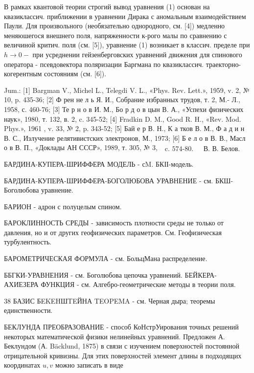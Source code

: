 \documentclass[10pt]{article}
\begin{document}
В рамках квантовой теории строгий вывод уравнения (1) основан на квазиклассич. приближении в уравнении Дирака с аномальным взаимодействием Паули. Для произвольного (необязательно однородного, см. [4]) медленно меняюшегося внешнего поля, напряженности к-рого малы по сравнению с величиной критич. поля (см. [5]), уравнение (1) возникает в классич. пределе при $h \rightarrow 0-$ при усреднении гейзенберговских уравнений движения для спинового оператора - псевдовектора поляризации Баргмана по квазиклассич. траекторно-когерентным состояниям (см. [6]).



Jum.: [1] Bargman V., Michel L., Telegdi V. L., «Phys. Rev. Lett.», 1959, v. 2, № 10, p. 435-36; [2] Ф рен не л ь Я. И., Собрание избранных трудов, т. 2, М.- Л., 1958, с. 460-76; [3] Те р н о в И. М., Бо р д о в цын В. А., «Успехи физических наук», 1980, т. 132, в. 2, c. 345-52; [4] Fradkin D. M., Good R. H., «Rev. Mod. Phys.», 1961 , v. 33, № 2, p. 343-52; [5] Бай е р В. Н., К а тков В. М., Ф а д и н В. С., Излучение релятивистских электронов, М., 1973; [6] Б е л о в В. В., Масл о в В. П., «Доклады АН СССР», 1989, т. 305, № 3, $\begin{array}{ll}\text { c. 574-80. } & \text { В. В. Белов. }\end{array}$



БАРДИНА-КУПЕРА-ШРИФФЕРА МОДЕЛЬ - сM. БКІІ-модель.



БАРДИНА-КУПЕРА-ШРИФФЕРА-БОГОЛЮБОВА УРАВНЕНИЕ - см. БКШ-Боголюбова уравнение.



БАРИОН - адрон с полуцелым спином.



БАРОКЛИННОСТЬ СРЕДЫ - зависимость плотности среды не только от давления, но и от других геофизических параметров. См. Геофизическая турбулентность.



БАРОМЕТРИЧЕСКАЯ ФОРМУЛА - см. БольцМана распределение.



ББГКИ-УРАВНЕНИЯ - см. Боголюбова цепочка уравнений. БЕЙКЕРА-АХИЕЗЕРА ФУНКЦИЯ - см. Алгебро-геометрические методы в теории поля.



38 БАЗИС БEKEHШTEЙНА TEOPEMA - см. Черная дыра; теоремы единственности.



БЕКЛУНДА ПРЕОБРАЗОВАНИЕ - способ КоНстрУирования точных решений некоторых математической физики нелинейных уравнений. Предложен А. Беклундом (А. Bäcklund, 1875) в связи с изучением поверхностей постоянной отрицательной кривизны. Для этих поверхностей элемент длины в подходящих координатах $u, v$ можно записать в виде
\end{document}
